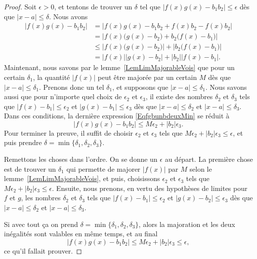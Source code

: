 \begin{proof}
	Soit \( \epsilon>0\), et tentons de trouver un \( \delta\) tel que \( | f(x)g(x)-b_1b_2 |\leq \epsilon\) dès que \( | x-a |\leq \delta\). Nous avons
	\begin{equation}    \label{EqfgbunbdeuxMin}
		\begin{split}
			| f(x)g(x)-b_1b_2 |&=|  f(x)g(x)-b_1b_2 +f(x)b_2-f(x)b_2 |\\
			&=\left|   f(x)\big( g(x)-b_2 \big)+b_2\big( f(x)-b_1 \big)    \right|\\
			&\leq \left|  f(x)\big( g(x)-b_2 \big)  \right|+\left| b_2\big( f(x)-b_1 \big) \right| \\
			&= | f(x) | | g(x)-b_2  |+| b_2 | |f(x)-b_1 |.
		\end{split}
	\end{equation}
    Maintenant, nous savons par le lemme~\ref{LemLimMajorableVois} que pour un certain \( \delta_1\), la quantité \( | f(x) |\) peut être majorée par un certain \( M\) dès que \( | x-a |\leq \delta_1\). Prenons donc un tel \( \delta_1\), et supposons que \( | x-a |\leq \delta_1\). Nous savons aussi que pour n'importe quel choix de \( \epsilon_2\) et \( \epsilon_3\), il existe des nombres \( \delta_2\) et \( \delta_3\) tels que \( | f(x)-b_1 |\leq \epsilon_2\) et \( | g(x)-b_1 |\leq \epsilon_3\) dès que \( | x-a |\leq\delta_2\) et \( | x-a |\leq\delta_3\). Dans ces conditions, la dernière expression \eqref{EqfgbunbdeuxMin} se réduit à
	\begin{equation}
		| f(x)g(x)-b_1b_2 |\leq M\epsilon_2+| b_2 |\epsilon_3.
	\end{equation}
	Pour terminer la preuve, il suffit de choisir \( \epsilon_2\) et \( \epsilon_3\) tels que \( M\epsilon_2+| b_2 |\epsilon_3\leq\epsilon\), et puis prendre \( \delta=\min\{ \delta_1,\delta_2,\delta_3 \}\).

	Remettons les choses dans l'ordre. On se donne un \( \epsilon\) au départ. La première chose est de trouver un \( \delta_1\) qui permette de majorer \( |f(x)|\) par \( M\) selon le lemme~\ref{LemLimMajorableVois}, et puis, choisissons \( \epsilon_2\) et \( \epsilon_3\) tels que \( M\epsilon_2+| b_2 |\epsilon_3\leq\epsilon\). Ensuite, nous prenons, en vertu des hypothèses de limites pour \( f\) et \( g\), les nombres \( \delta_2\) et \( \delta_3\) tels que \( | f(x)-b_1 |\leq \epsilon_2\) et \( | g(x)-b_2 |\leq \epsilon_3\) dès que \( | x-a |\leq \delta_2\) et \( | x-a |\leq \delta_3\).

	Si avec tout ça on prend \( \delta=\min\{ \delta_1,\delta_2,\delta_3 \}\), alors la majoration et les deux inégalités sont valables en même temps, et au final
	\[
		| f(x)g(x)-b_1b_2 |\leq M\epsilon_2+|b_2|\epsilon_3 \leq \epsilon,
	\]
	ce qu'il fallait prouver.
\end{proof}

